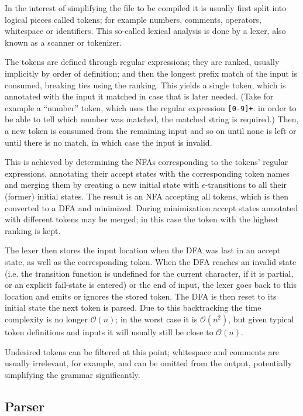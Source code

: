 			In the interest of simplifying the file to be compiled it is usually first split into logical pieces called tokens; for example numbers, comments, operators, whitespace or identifiers. This so-called lexical analysis is done by a lexer, also known as a scanner or tokenizer.
			
			The tokens are defined through regular expressions; they are ranked, usually implicitly by order of definition; and then the longest prefix match of the input is consumed, breaking ties using the ranking. This yields a single token, which is annotated with the input it matched in case that is later needed. (Take for example a ``number'' token, which uses the regular expression \lstinline$[0-9]+$: in order to be able to tell which number was matched, the matched string is required.) Then, a new token is consumed from the remaining input and so on until none is left or until there is no match, in which case the input is invalid.
			
			This is achieved by determining the NFAs corresponding to the tokens' regular expressions, annotating their accept states with the corresponding token names and merging them by creating a new initial state with $\epsilon$-transitions to all their (former) initial states. The result is an NFA accepting all tokens, which is then converted to a DFA and minimized. During minimization accept states annotated with different tokens may be merged; in this case the token with the highest ranking is kept.
			
			The lexer then stores the input location when the DFA was last in an accept state, as well as the corresponding token. When the DFA reaches an invalid state (i.e. the transition function is undefined for the current character, if it is partial, or an explicit fail-state is entered) or the end of input, the lexer goes back to this location and emits or ignores the stored token. The DFA is then reset to its initial state the next token is parsed. Due to this backtracking the time complexity is no longer $\mathcal{O}(n)$; in the worst case it is $\mathcal{O}(n^2)$, but given typical token definitions and inputs it will usually still be close to $\mathcal{O}(n)$.
			
			Undesired tokens can be filtered at this point; whitespace and comments are usually irrelevant, for example, and can be omitted from the output, potentially simplifying the grammar significantly.
		
		\subsection{Parser}
			

